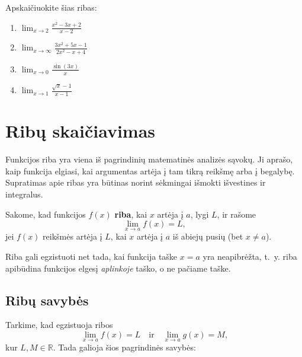 \begin{exercise}
Apskaičiuokite šias ribas:
\begin{enumerate}[label=\alph*)]
    \item $\displaystyle\lim_{x \to 2} \frac{x^2 - 3x + 2}{x - 2}$
    \item $\displaystyle\lim_{x \to \infty} \frac{3x^2 + 5x - 1}{2x^2 - x + 4}$
    \item $\displaystyle\lim_{x \to 0} \frac{\sin(3x)}{x}$
    \item $\displaystyle\lim_{x \to 1} \frac{\sqrt{x} - 1}{x - 1}$
\end{enumerate}
\end{exercise}

\section{Ribų skaičiavimas}

Funkcijos riba yra viena iš pagrindinių matematinės analizės sąvokų. Ji aprašo, kaip funkcija
elgiasi, kai argumentas artėja į tam tikrą reikšmę arba į begalybę. Supratimas apie ribas
yra būtinas norint sėkmingai išmokti išvestines ir integralus.

\begin{definition}
Sakome, kad funkcijos $f(x)$ \textbf{riba}, kai $x$ artėja į $a$, lygi $L$, ir rašome
\[
  \lim_{x \to a} f(x) = L,
\]
jei $f(x)$ reikšmės artėja į $L$, kai $x$ artėja į $a$ iš abiejų pusių (bet $x \neq a$).
\end{definition}

\begin{remark}
Riba gali egzistuoti net tada, kai funkcija taške $x = a$ yra neapibrėžta, t.~y. 
riba apibūdina funkcijos elgesį \emph{aplinkoje} taško, o ne pačiame taške.
\end{remark}

\subsection{Ribų savybės}

Tarkime, kad egzistuoja ribos
\[
  \lim_{x \to a} f(x) = L \quad \text{ir} \quad \lim_{x \to a} g(x) = M,
\]
kur $L, M \in \mathbb{R}$. Tada galioja šios pagrindinės savybės:

